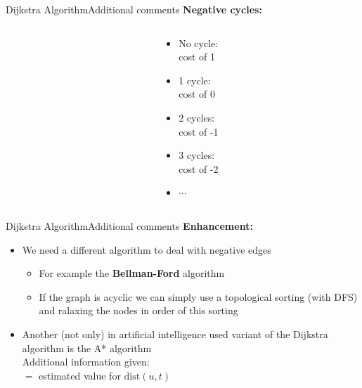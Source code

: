 \begin{frame}{Dijkstra Algorithm}{Additional comments}
  \textbf{Negative cycles:}
  \begin{columns}[c]
    \begin{column}{0.7\linewidth}
      \begin{adjustbox}{width=\linewidth}
        \def\DijkstraNegativeCycle{1}%
        
      \end{adjustbox}
    \end{column}
    \begin{column}{0.3\linewidth}
      \begin{itemize}
        \item
          No cycle:\\
          {\color{Mittel-Blau}cost of 1}
        \item
          1 cycle:\\
          {\color{Mittel-Blau}cost of 0}
        \item
          2 cycles:\\
          {\color{Mittel-Blau}cost of -1}
        \item
          3 cycles:\\
          {\color{Mittel-Blau}cost of -2}
        \item
          $\cdots$
      \end{itemize}
    \end{column}
  \end{columns}
\end{frame}


\begin{frame}{Dijkstra Algorithm}{Additional comments}
  \textbf{Enhancement:}
  \begin{itemize}
    \item
      We need a different algorithm to deal with negative edges
      \begin{itemize}
        \item
          For example the \textbf{Bellman-Ford} algorithm
        \item
          If the graph is {\color{Mittel-Blau}acyclic} we can simply use a
          topological sorting (with DFS) and ralaxing the nodes in order
          of this sorting
      \end{itemize}
    \item
      Another (not only) in artificial intelligence used variant of the Dijkstra
      algorithm is the {\color{Mittel-Blau}A* algorithm}\\
      Additional information given:\\
      $=$ estimated value for {\color{Mittel-Blau}$\mathrm{dist}(u, t)$}
  \end{itemize}
\end{frame}

